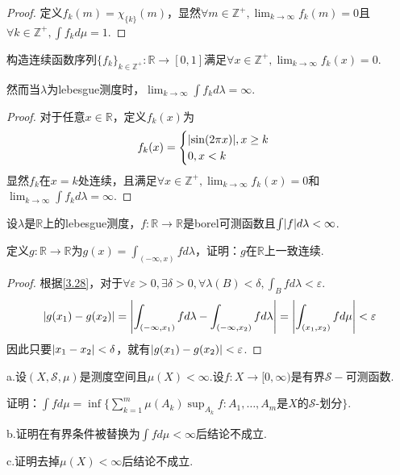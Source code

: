 \begin{proof}
    定义\(f_k(m)=\chi_{\{k\}}(m)\)，显然\(\forall m \in \mathbb{Z}^+, \lim_{k \to \infty}f_k(m)=0\)且\(\forall k \in \mathbb{Z}^+, \int f_k d\mu=1\).
\end{proof}

\begin{problem}[2]\label{3.B.2}
    构造连续函数序列\(\{f_k\}_{k \in \mathbb{Z}^+}: \mathbb{R} \to [0,1]\)满足\(\forall x \in \mathbb{Z}^+, \lim_{k \to \infty}f_k(x)=0\).

    然而当\(\lambda\)为lebesgue测度时，\(\lim_{k \to \infty} \int f_k d\lambda=\infty\).
\end{problem}

\begin{proof}
    对于任意\(x \in \mathbb{R}\)，定义\(f_k(x)\)为
    \begin{align*}
        f_k(x)=
        \begin{cases}
            \abs*{\sin(2\pi x)}, x \geq k \\
            0, x<k
        \end{cases}
    \end{align*}
    显然\(f_k\)在\(x=k\)处连续，且满足\(\forall x \in \mathbb{Z}^+, \lim_{k \to \infty}f_k(x)=0\)和\(\lim_{k \to \infty} \int f_k d\lambda=\infty\).
\end{proof}

\newpage

\begin{problem}[3]\label{3.B.3}
    设\(\lambda\)是\(\mathbb{R}\)上的lebesgue测度，\(f: \mathbb{R} \to \mathbb{R}\)是borel可测函数且\(\int \abs*{f} d\lambda<\infty\).

    定义\(g: \mathbb{R} \to \mathbb{R}\)为\(g(x)=\int_{(-\infty,x)} f d\lambda\)，证明：\(g\)在\(\mathbb{R}\)上一致连续.
\end{problem}

\begin{proof}
    根据\cref{3.28}，对于\(\forall \varepsilon>0, \exists \delta>0, \forall \lambda(B)<\delta, \int_B f d\lambda<\varepsilon\).
    \begin{align*}
        \abs*{g(x_1)-g(x_2)}=\abs*{\int_{(-\infty,x_1)} f d\lambda-\int_{(-\infty,x_2)} f d\lambda}=\abs*{\int_{(x_1,x_2)} f d\mu}<\varepsilon
    \end{align*}
    因此只要\(\abs*{x_1-x_2}<\delta\)，就有\(\abs*{g(x_1)-g(x_2)}<\varepsilon\).
\end{proof}

\begin{problem}[4]\label{3.B.4}
    a.设\((X, \mathcal{S}, \mu)\)是测度空间且\(\mu(X)<\infty\).设\(f: X \to [0,\infty)\)是有界\(\mathcal{S}-\)可测函数.

    证明：\(\int f d\mu=\inf\{\sum_{k=1}^m \mu(A_k)\sup_{A_k}f: A_1, \dots, A_m \text{是} X \text{的} \mathcal{S}\text{-划分}\}\).

    b.证明在有界条件被替换为\(\int f d\mu<\infty\)后结论不成立.

    c.证明去掉\(\mu(X)<\infty\)后结论不成立.
\end{problem}

